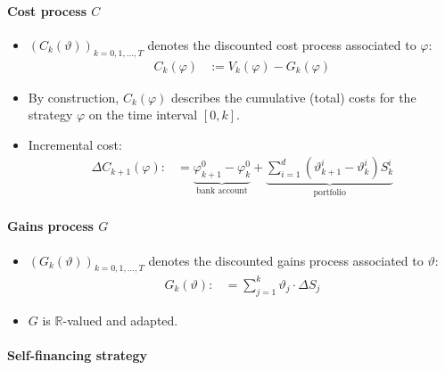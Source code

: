 \documentclass[a4paper,landscape,8pt,fleqn]{scrartcl}
\begin{document}
\begin{multicols*}{3}
\paragraph{Cost process $C$}

\begin{itemize}
\item $(C_k(\vartheta))_{k=0,1,\ldots, T}$ denotes the discounted cost process associated to $\varphi$:
\begin{align*}
C_k(\varphi)& := V_k(\varphi) - G_k(\varphi)
\end{align*}
\item By construction, $C_k(\varphi)$ describes the cumulative (total) costs for the strategy $\varphi$ on the time interval $[0,k]$.
\item Incremental cost:
\begin{align*}
\Delta C_{k+1}(\varphi) :&= \underbrace{\varphi_{k+1}^0 - \varphi_k^0}_\text{bank account} + \underbrace{\sum_{i=1}^d \left( \vartheta^i_{k+1} - \vartheta^i_k \right) S^i_k}_\text{portfolio}
\end{align*}
\end{itemize}

\paragraph{Gains process $G$}

\begin{itemize}
\item $(G_k(\vartheta))_{k=0,1,\ldots, T}$ denotes the discounted gains process associated to $\vartheta$:
\begin{align*}
G_k(\vartheta) :&= \sum_{j=1}^k \vartheta_j \cdot \Delta S_j
\end{align*}
\item $G$ is $\mathbb{R}$-valued and adapted.
\end{itemize}

\paragraph{Self-financing strategy}


\end{multicols*}
\end{document}
